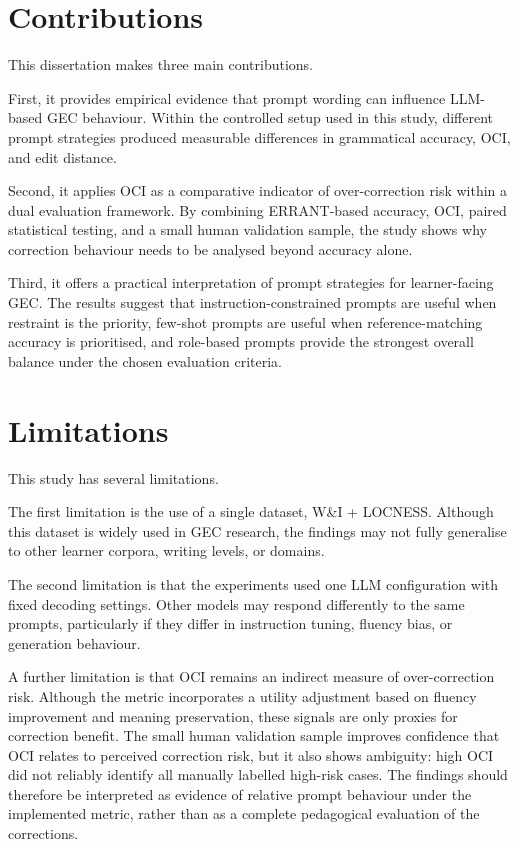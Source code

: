 \section{Contributions}

This dissertation makes three main contributions.

First, it provides empirical evidence that prompt wording can influence LLM-based GEC behaviour. Within the controlled setup used in this study, different prompt strategies produced measurable differences in grammatical accuracy, OCI, and edit distance.

Second, it applies OCI as a comparative indicator of over-correction risk within a dual evaluation framework. By combining ERRANT-based accuracy, OCI, paired statistical testing, and a small human validation sample, the study shows why correction behaviour needs to be analysed beyond accuracy alone.

Third, it offers a practical interpretation of prompt strategies for learner-facing GEC. The results suggest that instruction-constrained prompts are useful when restraint is the priority, few-shot prompts are useful when reference-matching accuracy is prioritised, and role-based prompts provide the strongest overall balance under the chosen evaluation criteria.

\section{Limitations}

This study has several limitations.

The first limitation is the use of a single dataset, W\&I + LOCNESS. Although this dataset is widely used in GEC research, the findings may not fully generalise to other learner corpora, writing levels, or domains.

The second limitation is that the experiments used one LLM configuration with fixed decoding settings. Other models may respond differently to the same prompts, particularly if they differ in instruction tuning, fluency bias, or generation behaviour.

A further limitation is that OCI remains an indirect measure of over-correction risk. Although the metric incorporates a utility adjustment based on fluency improvement and meaning preservation, these signals are only proxies for correction benefit. The small human validation sample improves confidence that OCI relates to perceived correction risk, but it also shows ambiguity: high OCI did not reliably identify all manually labelled high-risk cases. The findings should therefore be interpreted as evidence of relative prompt behaviour under the implemented metric, rather than as a complete pedagogical evaluation of the corrections.

